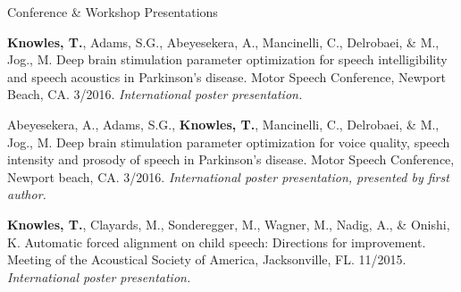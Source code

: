 \documentclass{resume} %
\begin{document}
\begin{rSection}{Conference \& Workshop Presentations}
	
	{\bf Knowles, T.}, Adams, S.G., Abeyesekera, A., Mancinelli, C., Delrobaei, \& M., Jog., M. Deep brain stimulation parameter optimization for speech intelligibility and speech acoustics in Parkinson's disease. Motor Speech Conference, Newport Beach, CA. 3/2016. \emph{International poster presentation.}
	
	Abeyesekera, A., Adams, S.G., {\bf Knowles, T.}, Mancinelli, C., Delrobaei, \& M., Jog., M. Deep brain stimulation parameter optimization for voice quality, speech intensity and prosody of speech in Parkinson's disease. Motor Speech Conference, Newport beach, CA. 3/2016. \emph{International poster presentation, presented by first author.}
	
	
	{\bf Knowles, T.}, Clayards, M., Sonderegger, M., Wagner, M., Nadig, A., \& Onishi, K. Automatic forced alignment on child speech: Directions for improvement. Meeting of the Acoustical Society of America, Jacksonville, FL. 11/2015. \emph{International poster presentation.}
	

\end{rSection}
\end{document}
